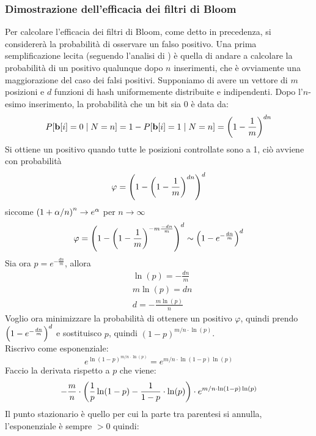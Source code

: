 \subsubsection{Dimostrazione dell'efficacia dei filtri di Bloom}
Per calcolare l'efficacia dei filtri di Bloom, come detto in precedenza, si considererà la probabilità di osservare un falso positivo. Una prima semplificazione lecita (seguendo l'analisi di \cite{Bloom}) è quella di andare a calcolare la probabilità di un positivo qualunque dopo $n$ inserimenti, che è ovviamente una maggiorazione del caso dei falsi positivi.
Supponiamo di avere un vettore di $m$ posizioni e $d$ funzioni di hash uniformemente distribuite e indipendenti. Dopo l'$n$-esimo inserimento, la probabilità che un bit sia 0 è data da:
\begin{equation*}
    P[\textbf{b}[i] = 0 \hspace{1mm}|\hspace{1mm} N = n] = 1 - P[\textbf{b}[i] = 1 \hspace{1mm}|\hspace{1mm} N = n] = \left(1 - \frac{1}{m}\right)^{dn}
\end{equation*}
Si ottiene un positivo quando tutte le posizioni controllate sono a 1, ciò avviene con probabilità
\begin{equation*}
    \varphi = \left(1 - \left(1 - \frac{1}{m}\right)^{dn}\right)^d
\end{equation*}
siccome $\left(1 + \alpha/n\right)^n \rightarrow e^{\alpha}$ per $n \rightarrow \infty$
\begin{equation*}
    \varphi = \left(1 - \left(1 - \frac{1}{m}\right)^{-m \frac{-dn}{m}}\right)^d \sim \left(1 - e^{-\frac{dn}{m}}\right)^d
\end{equation*}
Sia ora $p = e^{-\frac{dn}{m}}$, allora 
\begin{align*}
    &\ln(p) = -\frac{dn}{m}\\
    &m\ln(p) = dn\\
    &d = -\frac{m\ln(p)}{n}
\end{align*}
Voglio ora minimizzare la probabilità di ottenere un positivo $\varphi$, quindi prendo $\left(1 - e^{-\frac{dn}{m}}\right)^d$ e sostituisco $p$, quindi $(1 - p)^{m/n \cdot \ln(p)}$.\\
Riscrivo come esponenziale:
\begin{equation*}
    e^{\ln(1 - p)^{m/n \cdot \ln(p)}} = e^{m/n \cdot \ln(1 - p)\ln(p)}
\end{equation*}
Faccio la derivata rispetto a $p$ che viene:
\begin{equation*}
    -\frac{m}{n} \cdot \left(\frac{1}{p}\ln(1 - p) - \frac{1}{1 - p} \cdot \ln(p)\right) \cdot e^{m/n \cdot \ln(1 - p)\ln(p)}
\end{equation*}
Il punto stazionario è quello per cui la parte tra parentesi si annulla, l'esponenziale è sempre $> 0$ quindi:
